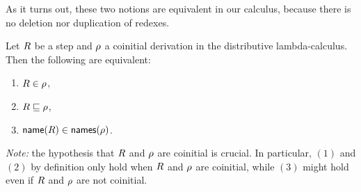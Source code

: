 As it turns out, these two notions are equivalent in our calculus, because
there is no deletion nor duplication of redexes.

\begin{lemma}
Let $R$ be a step and $\rho$ a coinitial derivation
in the distributive lambda-calculus.
Then the following are equivalent:
\begin{enumerate}
\item $R \in \rho$,
\item $R \sqsubseteq \rho$,
\item $\mathsf{name}(R) \in \mathsf{names}(\rho)$.
\end{enumerate}
{\em Note:} the hypothesis that $R$ and $\rho$ are coinitial is crucial.
In particular, $(1)$ and $(2)$ by definition only hold when $R$ and $\rho$ are coinitial,
while $(3)$ might hold even if $R$ and $\rho$ are not coinitial.
\end{lemma}
